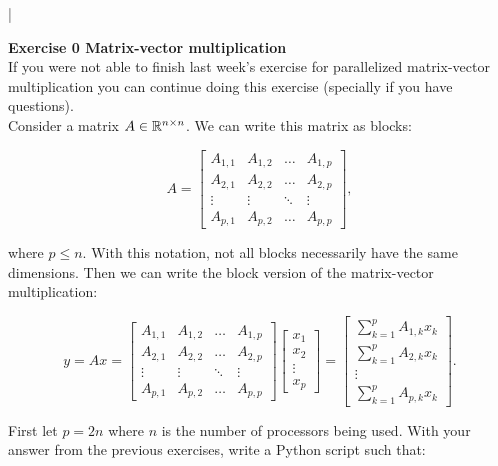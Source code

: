 \documentclass[11pt]{article}
\begin{document}
\lstset{frameround=fttt,language=Matlab}

\lstMakeShortInline[columns=fixed]|


{\bf{Exercise 0 Matrix-vector multiplication}}\\

If you were not able to finish last week's exercise for parallelized matrix-vector multiplication you can continue doing this exercise (specially if you have questions). \\

Consider a matrix $A \in \mathbb{R}^{n \times n}$. We can write this matrix as blocks:

\[ A = \begin{bmatrix} A_{1,1} & A_{1, 2} & \hdots & A_{1,p} \\  A_{2,1} & A_{2, 2} & \hdots & A_{2,p} \\ \vdots & \vdots & \ddots & \vdots \\ A_{p,1} & A_{p, 2} & \hdots & A_{p,p}    \end{bmatrix} , \]

where $p \leq n$. With this notation, not all blocks necessarily have the same dimensions. Then we can write the block version of the matrix-vector multiplication:

\[ y = Ax =  \begin{bmatrix} A_{1,1} & A_{1, 2} & \hdots & A_{1,p} \\  A_{2,1} & A_{2, 2} & \hdots & A_{2,p} \\ \vdots & \vdots & \ddots & \vdots \\ A_{p,1} & A_{p, 2} & \hdots & A_{p,p}    \end{bmatrix} \begin{bmatrix} x_{1} \\ x_{2} \\ \vdots \\ x_{p}  \end{bmatrix} = \begin{bmatrix} \sum_{k = 1}^p A_{1, k} x_k \\  \sum_{k = 1}^p A_{2, k} x_k \\ \vdots \\ \sum_{k = 1}^p A_{p, k} x_k\end{bmatrix}  .  \]

First let $p = 2n$ where $n$ is the number of processors being used. With your answer from the previous exercises, write a Python script such that: \\
\end{document}
